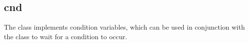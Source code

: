 %
%
%
%
%              

\subsection{cnd}
\label{cnd}

The  class implements condition variables, which can be used in
conjunction with the  class to wait for a
condition to occur.

